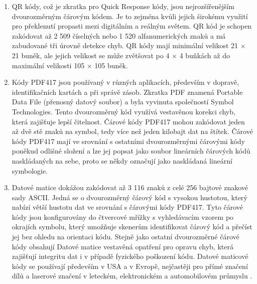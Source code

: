\begin{enumerate}
    \item QR kódy, což je zkratka pro Quick Response kódy, jsou nejrozšířenějším dvourozměrným čárovým kódem. Je to zejména kvůli jejich širokému využití pro překlenutí propasti mezi digitálním a reálným světem. QR kód je schopen zakódovat až 2 509 číselných nebo 1 520 alfanumerických znaků a má zabudované tři úrovně detekce chyb. QR kódy mají minimální velikost 21 × 21 buněk, ale jejich velikost se může zvětšovat po 4 × 4 buňkách až do maximální velikosti 105 × 105 buněk.
    \item Kódy PDF417 jsou používaný v různých aplikacích, především v dopravě, identifikačních kartách a při správě zásob. Zkratka PDF znamená Portable Data File (přenosný datový soubor) a byla vyvinuta společností Symbol Technologies. Tento dvourozměrný kód využívá vestavěnou korekci chyb, která zajišťuje lepší čitelnost. Čárové kódy PDF417 mohou zakódovat jeden až dvě stě znaků na symbol, tedy více než jeden kilobajt dat na štítek. Čárové kódy PDF417 mají ve srovnání s ostatními dvourozměrnými čárovými kódy poněkud odlišné složení a lze jej popsat jako soubor lineárních čárových kódů naskládaných na sebe, proto se někdy označují jako naskládaná lineární symbologie.
    \item Datové matice dokážou zakódovat až 3 116 znaků z celé 256 bajtové znakové sady ASCII. Jedná se o dvourozměrný čárový kód s vysokou hustotou, který nabízí větší hustotu dat ve srovnání s čárovými kódy PDF417. Tyto čárové kódy jsou konfigurovány do čtvercové mřížky s vyhledávacím vzorem po okrajích symbolu, který umožňuje skenerům identifikovat čárový kód a přečíst jej bez ohledu na orientaci kódu. Stejně jako ostatní dvourozměrné čárové kódy obsahují Datové matice vestavěná opatření pro opravu chyb, která zajišťují integritu dat i v případě fyzického poškození kódu. Datové maticové kódy se používají především v USA a v Evropě, nejčastěji pro přímé značení dílů a laserové značení v leteckém, elektronickém a automobilovém průmyslu \cite{barcode_types}.
\end{enumerate}


